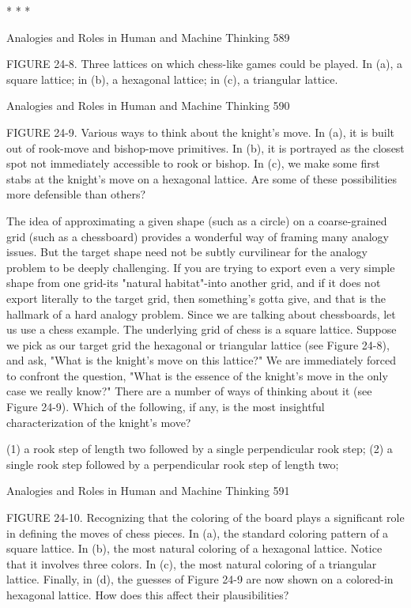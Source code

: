                                           *   *   *




Analogies and Roles in Human and Machine Thinking                                        589

FIGURE 24-8. Three lattices on which chess-like games could be played. In (a), a
square lattice; in (b), a hexagonal lattice; in (c), a triangular lattice.




Analogies and Roles in Human and Machine Thinking                           590

FIGURE 24-9. Various ways to think about the knight's move. In (a), it is built out of
rook-move and bishop-move primitives. In (b), it is portrayed as the closest spot not
immediately accessible to rook or bishop. In (c), we make some first stabs at the
knight's move on a hexagonal lattice. Are some of these possibilities more defensible
than others?

        The idea of approximating a given shape (such as a circle) on a coarse-grained
grid (such as a chessboard) provides a wonderful way of framing many analogy
issues. But the target shape need not be subtly curvilinear for the analogy problem to
be deeply challenging. If you are trying to export even a very simple shape from one
grid-its "natural habitat"-into another grid, and if it does not export literally to the
target grid, then something's gotta give, and that is the hallmark of a hard analogy
problem.
        Since we are talking about chessboards, let us use a chess example. The
underlying grid of chess is a square lattice. Suppose we pick as our target grid the
hexagonal or triangular lattice (see Figure 24-8), and ask, "What is the knight's move
on this lattice?" We are immediately forced to confront the question, "What is the
essence of the knight's move in the only case we really know?" There are a number of
ways of thinking about it (see Figure 24-9). Which of the following, if any, is the
most insightful characterization of the knight's move?

(1) a rook step of length two followed by a single perpendicular rook step; (2) a single
rook step followed by a perpendicular rook step of length two;




Analogies and Roles in Human and Machine Thinking                                   591

FIGURE 24-10. Recognizing that the coloring of the board plays a significant role in
defining the moves of chess pieces. In (a), the standard coloring pattern of a square
lattice. In (b), the most natural coloring of a hexagonal lattice. Notice that it involves
three colors. In (c), the most natural coloring of a triangular lattice. Finally, in (d),
the guesses of Figure 24-9 are now shown on a colored-in hexagonal lattice. How
does this affect their plausibilities?




